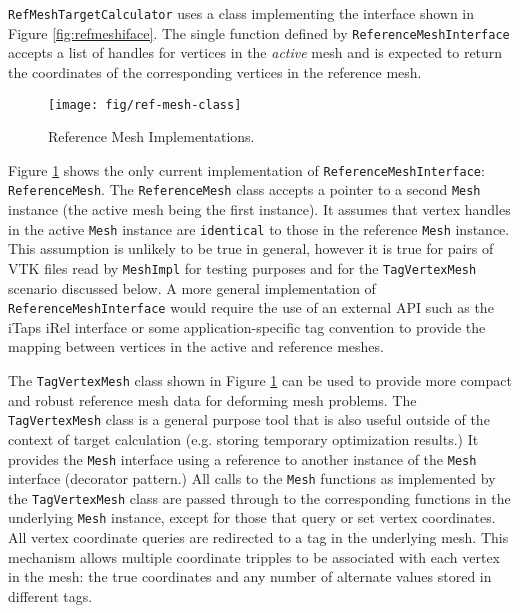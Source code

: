 \documentclass{article}
\begin{document}
\texttt{RefMeshTargetCalculator} uses a class implementing the interface shown in Figure \ref{fig:refmeshiface}.  The single function defined by \texttt{ReferenceMeshInterface} accepts a list of handles for vertices in the \emph{active} mesh and is expected to return the coordinates of the corresponding vertices in the reference mesh.

\begin{figure}[htb]
\begin{center}
\texttt{[image: fig/ref-mesh-class]}
\caption{Reference Mesh Implementations.\label{fig:refmesh}}
\end{center}
\end{figure}

Figure \ref{fig:refmesh} shows the only current implementation of \texttt{ReferenceMeshInterface}: \texttt{ReferenceMesh}.  The \texttt{ReferenceMesh} class accepts a pointer to a second \texttt{Mesh} instance (the active mesh being the first instance).  It assumes that vertex handles in the active \texttt{Mesh} instance are \texttt{identical} to those in the reference \texttt{Mesh} instance.  This assumption is unlikely to be true in general, however it is true for pairs of VTK files read by \texttt{MeshImpl} for testing purposes and for the \texttt{TagVertexMesh} scenario discussed below.  A more general implementation of \texttt{ReferenceMeshInterface} would require the use of an external API such as the iTaps iRel interface or some application-specific tag convention to provide the mapping between vertices in the active and reference meshes.

The \texttt{TagVertexMesh} class shown in Figure \ref{fig:refmesh} can be used to provide more compact and robust reference mesh data for deforming mesh problems.  The \texttt{TagVertexMesh} class is a general purpose tool that is also useful outside of the context of target calculation (e.g. storing temporary optimization results.)  It provides the \texttt{Mesh} interface using a reference to another instance of the \texttt{Mesh} interface (decorator pattern.)  All calls to the \texttt{Mesh} functions as implemented by the \texttt{TagVertexMesh} class are passed through to the corresponding functions in the underlying \texttt{Mesh} instance, except for those that query or set vertex coordinates.  All vertex coordinate queries are redirected to a tag in the underlying mesh.  This mechanism allows multiple coordinate tripples to be associated with each vertex in the mesh: the true coordinates and any number of alternate values stored in different tags.
\end{document}
